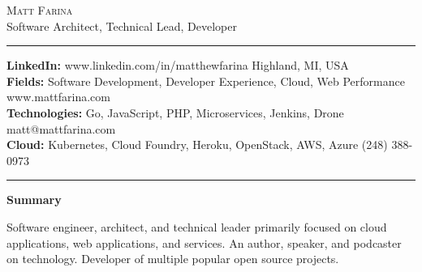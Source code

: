 \documentclass[10pt,A4]{article}
\renewcommand{\headrulewidth}{0pt}
\newcommand{\cvsection}[1]
{
	\begin{center}
		\large\textcolor{sectcol}{\textbf{#1}}
	\end{center}
}
\newcommand{\metasection}[2]
{
\footnotesize{#2} \hspace*{\fill} \footnotesize{#1}\\[1pt]
}
\begin{document}
\pagestyle{fancy}







\vspace{-8pt}
\begin{center}
	\HUGE \textsc{Matt Farina}\\[2pt]
	\small Software Architect, Technical Lead, Developer
\end{center}

\textcolor{sectcol}{\hrule}

\vspace{6pt}


\metasection{Highland, MI, USA}{\textbf{LinkedIn:} www.linkedin.com/in/matthewfarina}
\metasection{www.mattfarina.com}{\textbf{Fields:} Software Development, Developer Experience, Cloud, Web Performance} 
\metasection{matt@mattfarina.com}{\textbf{Technologies:} Go, JavaScript, PHP, Microservices, Jenkins, Drone}
\metasection{(248) 388-0973}{\textbf{Cloud:} Kubernetes, Cloud Foundry, Heroku, OpenStack, AWS, Azure}
\vspace{-4pt}
\textcolor{sectcol}{\hrule}
\vspace{6pt}

\normalsize

\vspace{-6pt}
\cvsection{Summary}
Software engineer, architect, and technical leader primarily focused on cloud applications, web applications, and services. An author, speaker, and podcaster on technology. Developer of multiple popular open source projects.\
\end{document}
